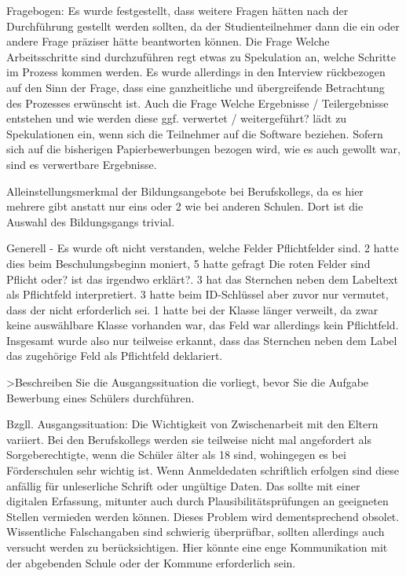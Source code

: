 Fragebogen: Es wurde festgestellt, dass weitere Fragen hätten nach der Durchführung gestellt werden sollten, da der Studienteilnehmer dann die ein oder andere Frage präziser hätte beantworten können.
Die Frage \glqq Welche Arbeitsschritte sind durchzuführen\grqq{} regt etwas zu Spekulation an, welche Schritte im Prozess kommen werden. Es wurde allerdings in den Interview rückbezogen auf den Sinn der Frage, dass eine ganzheitliche und übergreifende Betrachtung des Prozesses erwünscht ist.
Auch die Frage \glqq Welche Ergebnisse / Teilergebnisse entstehen und wie werden diese ggf. verwertet / weitergeführt?\grqq{} lädt zu Spekulationen ein, wenn sich die Teilnehmer auf die Software beziehen. Sofern sich auf die bisherigen Papierbewerbungen bezogen wird, wie es auch gewollt war, sind es verwertbare Ergebnisse.

Alleinstellungsmerkmal der Bildungsangebote bei Berufskollegs, da es hier mehrere gibt anstatt nur eins oder 2 wie bei anderen Schulen. Dort ist die Auswahl des Bildungsgangs trivial.

Generell
- Es wurde oft nicht verstanden, welche Felder Pflichtfelder sind. 2 hatte dies beim Beschulungsbeginn moniert, 5 hatte gefragt \glqq Die roten Felder sind Pflicht oder? ist das irgendwo erklärt?\grqq{}. 3 hat das Sternchen neben dem Labeltext als Pflichtfeld interpretiert. 3 hatte beim ID-Schlüssel aber zuvor nur vermutet, dass der nicht erforderlich sei. 1 hatte bei der Klasse länger verweilt, da zwar keine auswählbare Klasse vorhanden war, das Feld war allerdings kein Pflichtfeld. Insgesamt wurde also nur teilweise  erkannt, dass das Sternchen neben dem Label das zugehörige Feld als Pflichtfeld deklariert.



>Beschreiben Sie die Ausgangssituation die vorliegt, bevor Sie die Aufgabe \glqq Bewerbung eines Schülers\grqq{} durchführen.


Bzgll. Ausgangssituation:
Die Wichtigkeit von Zwischenarbeit mit den Eltern variiert. Bei den Berufskollegs werden sie teilweise nicht mal angefordert als Sorgeberechtigte, wenn die Schüler älter als 18 sind, wohingegen es bei Förderschulen sehr wichtig ist.
Wenn Anmeldedaten schriftlich erfolgen sind diese anfällig für unleserliche Schrift oder ungültige Daten. Das sollte mit einer digitalen Erfassung, mitunter auch durch Plausibilitätsprüfungen an geeigneten Stellen vermieden werden können. Dieses Problem wird dementsprechend obsolet. Wissentliche Falschangaben sind schwierig überprüfbar, sollten allerdings auch versucht werden zu berücksichtigen. Hier könnte eine enge Kommunikation mit der abgebenden Schule oder der Kommune erforderlich sein.




